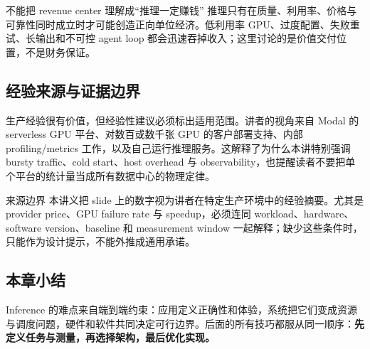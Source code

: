 \begin{warningbox}{不能把 revenue center 理解成“推理一定赚钱”}
推理只有在质量、利用率、价格与可靠性同时成立时才可能创造正向单位经济。低利用率 GPU、过度配置、失败重试、长输出和不可控 agent loop 都会迅速吞掉收入；这里讨论的是价值交付位置，不是财务保证。
\end{warningbox}

\subsection{经验来源与证据边界}

生产经验很有价值，但经验性建议必须标出适用范围。讲者的视角来自 Modal 的 serverless GPU 平台、对数百或数千张 GPU 的客户部署支持、内部 profiling/metrics 工作，以及自己运行推理服务。这解释了为什么本讲特别强调 bursty traffic、cold start、host overhead 与 observability，也提醒读者不要把单个平台的统计量当成所有数据中心的物理定律。


\begin{warningbox}{来源边界}
本讲义把 slide 上的数字视为讲者在特定生产环境中的经验摘要。尤其是 provider price、GPU failure rate 与 speedup，必须连同 workload、hardware、software version、baseline 和 measurement window 一起解释；缺少这些条件时，只能作为设计提示，不能外推成通用承诺。
\end{warningbox}

\subsection{本章小结}

Inference 的难点来自端到端约束：应用定义正确性和体验，系统把它们变成资源与调度问题，硬件和软件共同决定可行边界。后面的所有技巧都服从同一顺序：\textbf{先定义任务与测量，再选择架构，最后优化实现。}

